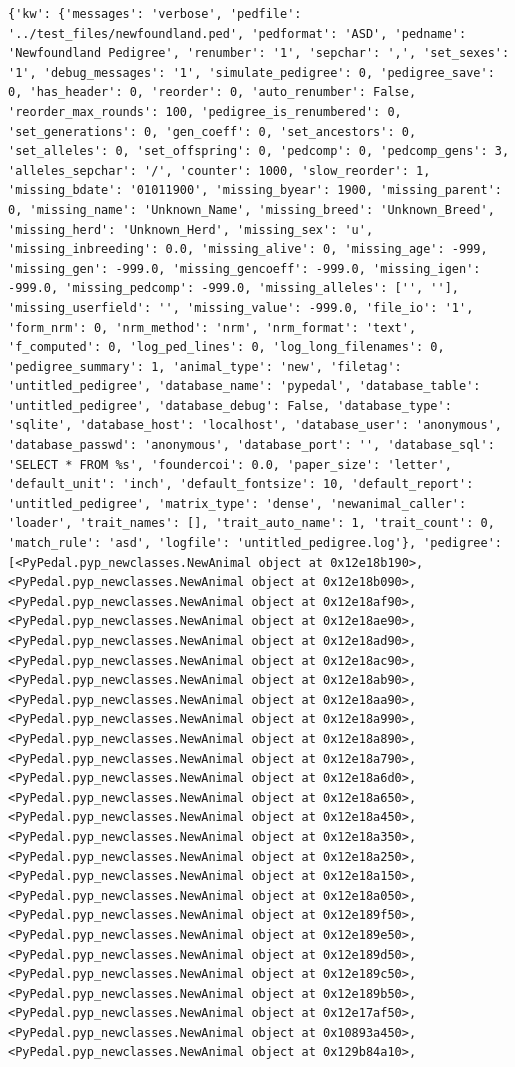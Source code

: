 \documentclass[
  letterpaper,
  DIV=11,
  numbers=noendperiod]{scrreprt}
\begin{document}
\begin{codelisting}
{\begin{verbatim}
{'kw': {'messages': 'verbose', 'pedfile': '../test_files/newfoundland.ped', 'pedformat': 'ASD', 'pedname': 'Newfoundland Pedigree', 'renumber': '1', 'sepchar': ',', 'set_sexes': '1', 'debug_messages': '1', 'simulate_pedigree': 0, 'pedigree_save': 0, 'has_header': 0, 'reorder': 0, 'auto_renumber': False, 'reorder_max_rounds': 100, 'pedigree_is_renumbered': 0, 'set_generations': 0, 'gen_coeff': 0, 'set_ancestors': 0, 'set_alleles': 0, 'set_offspring': 0, 'pedcomp': 0, 'pedcomp_gens': 3, 'alleles_sepchar': '/', 'counter': 1000, 'slow_reorder': 1, 'missing_bdate': '01011900', 'missing_byear': 1900, 'missing_parent': 0, 'missing_name': 'Unknown_Name', 'missing_breed': 'Unknown_Breed', 'missing_herd': 'Unknown_Herd', 'missing_sex': 'u', 'missing_inbreeding': 0.0, 'missing_alive': 0, 'missing_age': -999, 'missing_gen': -999.0, 'missing_gencoeff': -999.0, 'missing_igen': -999.0, 'missing_pedcomp': -999.0, 'missing_alleles': ['', ''], 'missing_userfield': '', 'missing_value': -999.0, 'file_io': '1', 'form_nrm': 0, 'nrm_method': 'nrm', 'nrm_format': 'text', 'f_computed': 0, 'log_ped_lines': 0, 'log_long_filenames': 0, 'pedigree_summary': 1, 'animal_type': 'new', 'filetag': 'untitled_pedigree', 'database_name': 'pypedal', 'database_table': 'untitled_pedigree', 'database_debug': False, 'database_type': 'sqlite', 'database_host': 'localhost', 'database_user': 'anonymous', 'database_passwd': 'anonymous', 'database_port': '', 'database_sql': 'SELECT * FROM %s', 'foundercoi': 0.0, 'paper_size': 'letter', 'default_unit': 'inch', 'default_fontsize': 10, 'default_report': 'untitled_pedigree', 'matrix_type': 'dense', 'newanimal_caller': 'loader', 'trait_names': [], 'trait_auto_name': 1, 'trait_count': 0, 'match_rule': 'asd', 'logfile': 'untitled_pedigree.log'}, 'pedigree': [<PyPedal.pyp_newclasses.NewAnimal object at 0x12e18b190>, <PyPedal.pyp_newclasses.NewAnimal object at 0x12e18b090>, <PyPedal.pyp_newclasses.NewAnimal object at 0x12e18af90>, <PyPedal.pyp_newclasses.NewAnimal object at 0x12e18ae90>, <PyPedal.pyp_newclasses.NewAnimal object at 0x12e18ad90>, <PyPedal.pyp_newclasses.NewAnimal object at 0x12e18ac90>, <PyPedal.pyp_newclasses.NewAnimal object at 0x12e18ab90>, <PyPedal.pyp_newclasses.NewAnimal object at 0x12e18aa90>, <PyPedal.pyp_newclasses.NewAnimal object at 0x12e18a990>, <PyPedal.pyp_newclasses.NewAnimal object at 0x12e18a890>, <PyPedal.pyp_newclasses.NewAnimal object at 0x12e18a790>, <PyPedal.pyp_newclasses.NewAnimal object at 0x12e18a6d0>, <PyPedal.pyp_newclasses.NewAnimal object at 0x12e18a650>, <PyPedal.pyp_newclasses.NewAnimal object at 0x12e18a450>, <PyPedal.pyp_newclasses.NewAnimal object at 0x12e18a350>, <PyPedal.pyp_newclasses.NewAnimal object at 0x12e18a250>, <PyPedal.pyp_newclasses.NewAnimal object at 0x12e18a150>, <PyPedal.pyp_newclasses.NewAnimal object at 0x12e18a050>, <PyPedal.pyp_newclasses.NewAnimal object at 0x12e189f50>, <PyPedal.pyp_newclasses.NewAnimal object at 0x12e189e50>, <PyPedal.pyp_newclasses.NewAnimal object at 0x12e189d50>, <PyPedal.pyp_newclasses.NewAnimal object at 0x12e189c50>, <PyPedal.pyp_newclasses.NewAnimal object at 0x12e189b50>, <PyPedal.pyp_newclasses.NewAnimal object at 0x12e17af50>, <PyPedal.pyp_newclasses.NewAnimal object at 0x10893a450>, <PyPedal.pyp_newclasses.NewAnimal object at 0x129b84a10>, 
\end{verbatim}}
\end{codelisting}
\end{document}
